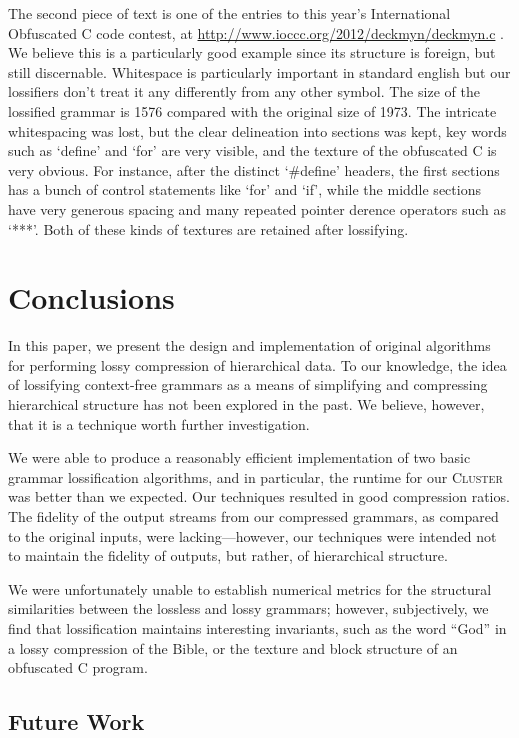 \documentclass[11pt]{article}
\newcommand{\Cluster}{\textsc{Cluster}\xspace}
\begin{document}
The second piece of text is one of the entries to this year's International
Obfuscated C code contest, at \url{http://www.ioccc.org/2012/deckmyn/deckmyn.c}
. We believe this is a particularly good example since its structure is
foreign, but still discernable. Whitespace is particularly important in
standard english but our lossifiers don't treat it any differently from any
other symbol.  The size of the lossified grammar is 1576 compared with the
original size of 1973. The intricate whitespacing was lost, but the clear
delineation into sections was kept, key words such as `define' and `for' are
very visible, and the texture of the obfuscated C is very obvious. For
instance, after the distinct `\#define' headers, the first sections has a bunch
of control statements like `for' and `if', while the middle sections have very
generous spacing and many repeated pointer derence operators such as `***'.
Both of these kinds of textures are retained after lossifying.

\section{Conclusions}

In this paper, we present the design and implementation of original algorithms
for performing lossy compression of hierarchical data.  To our knowledge, the
idea of lossifying context-free grammars as a means of simplifying and
compressing hierarchical structure has not been explored in the past.  We
believe, however, that it is a technique worth further investigation.

We were able to produce a reasonably efficient implementation of two basic
grammar lossification algorithms, and in particular, the runtime for our
\Cluster was better than we expected.  Our techniques resulted in good
compression ratios.  The fidelity of the output streams from our compressed
grammars, as compared to the original inputs, were lacking---however, our
techniques were intended not to maintain the fidelity of outputs, but rather,
of hierarchical structure.

We were unfortunately unable to establish numerical metrics for the structural
similarities between the lossless and lossy grammars; however, subjectively, we
find that lossification maintains interesting invariants, such as the word
``God'' in a lossy compression of the Bible, or the texture and block structure
of an obfuscated C program.

\subsection{Future Work}
\end{document}
